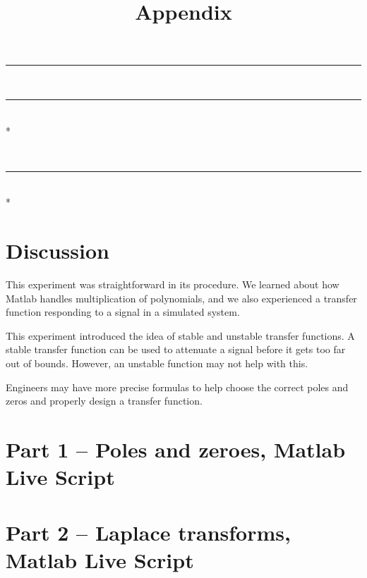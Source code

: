 \documentclass[12pt]{article}
\newlength\oldparskip
\newlength\newparskip
\newcommand*\setparskip{\setlength\parskip\newparskip}
\newcommand*\resetparskip{\setlength\parskip\oldparskip}
\def\hr{{\par\noindent\rule{\textwidth}{0.4pt}}}
\begin{document}
\hr
\resetparskip

\setparskip

\ \hr \\*
\resetparskip

\setparskip

\ \hr \\*

\section{Discussion}

This experiment was straightforward in its procedure.
We learned about how Matlab handles multiplication of polynomials,
and we also experienced a transfer function responding to a signal in a simulated system.

This experiment introduced the idea of stable and unstable transfer functions.
A stable transfer function can be used to attenuate a signal before it gets too far out of bounds.
However, an unstable function may not help with this.

Engineers may have more precise formulas to help choose the correct poles and zeros and properly design a transfer function.


\newpage
\appendix
\title{Appendix}\label{doc:apx}
\maketitle

\section{Part 1 -- Poles and zeroes, Matlab Live Script}



\section{Part 2 -- Laplace transforms, Matlab Live Script}


\end{document}
